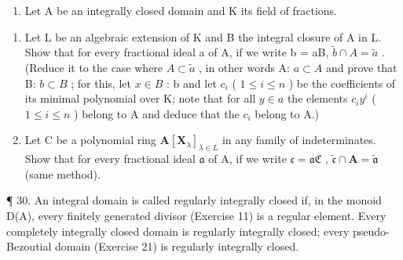 \begin{enumerate}
\def\labelenumi{\arabic{enumi}.}
\setcounter{enumi}{28}
\tightlist
\item
  Let A be an integrally closed domain and K its field of fractions.
\end{enumerate}

\begin{enumerate}
\def\labelenumi{(\alph{enumi})}
\item
  Let L be an algebraic extension of K and B the integral closure of A in L. Show that for every fractional ideal a of A, if we write b = aB, \(\tilde{b} \cap A = \tilde{a}\) . (Reduce it to the case where \(A \subset \tilde{a}\) , in other words A: \(a \subset A\) and prove that B: \(b \subset B\) ; for this, let \(x \in B\) : b and let \(c_i\) ( \(1 \leqslant i \leqslant n\) ) be the coefficients of its minimal polynomial over K; note that for all \(y \in a\) the elements \(c_i y^i\) ( \(1 \leqslant i \leqslant n\) ) belong to A and deduce that the \(c_i\) belong to A.)
\item
  Let C be a polynomial ring \(\mathbf{A}[\mathbf{X}_{\lambda}]_{\lambda \in L}\) in any family of indeterminates. Show that for every fractional ideal \(\mathfrak{a}\) of A, if we write \(\mathfrak{c} = \mathfrak{aC}\) , \(\tilde{\mathfrak{c}} \cap \mathbf{A} = \tilde{\mathfrak{a}}\) (same method).
\end{enumerate}

¶ 30. An integral domain is called regularly integrally closed if, in the monoid D(A), every finitely generated divisor (Exercise 11) is a regular element. Every completely integrally closed domain is regularly integrally closed; every pseudo-Bezoutial domain (Exercise 21) is regularly integrally closed.

